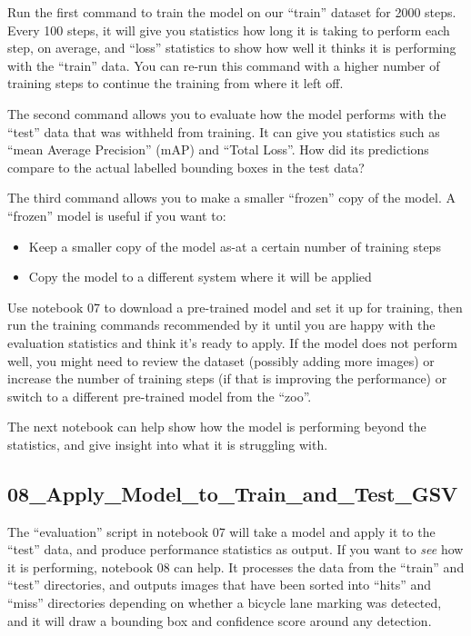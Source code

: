 \documentclass[11pt,twoside]{report}
\begin{document}
Run the first command to train the model on our ``train'' dataset for 2000 steps.  Every 100 steps, it will give you statistics how long it is taking to perform each step, on average, and ``loss'' statistics to show how well it thinks it is performing with the ``train'' data.  You can re-run this command with a higher number of training steps to continue the training from where it left off.

The second command allows you to evaluate how the model performs with the ``test'' data that was withheld from training.  It can give you statistics such as ``mean Average Precision'' (mAP) and ``Total Loss''.  How did its predictions compare to the actual labelled bounding boxes in the test data?

The third command allows you to make a smaller ``frozen'' copy of the model.  A ``frozen'' model is useful if you want to:

\begin{itemize}
\item{Keep a smaller copy of the model as-at a certain number of training steps}
\item{Copy the model to a different system where it will be applied}
\end{itemize}

Use notebook 07 to download a pre-trained model and set it up for training, then run the training commands recommended by it until you are happy with the evaluation statistics and think it's ready to apply.  If the model does not perform well, you might need to review the dataset (possibly adding more images) or increase the number of training steps (if that is improving the performance) or switch to a different pre-trained model from the ``zoo''.

The next notebook can help show how the model is performing beyond the statistics, and give insight into what it is struggling with.


\subsection{08\_Apply\_Model\_to\_Train\_and\_Test\_GSV}
\label{a08}

The ``evaluation'' script in notebook 07 will take a model and apply it to the ``test'' data, and produce performance statistics as output.  If you want to \textit{see} how it is performing, notebook 08 can help.  It processes the data from the ``train'' and ``test'' directories, and outputs images that have been sorted into ``hits'' and ``miss'' directories depending on whether a bicycle lane marking was detected, and it will draw a bounding box and confidence score around any detection.
\end{document}
